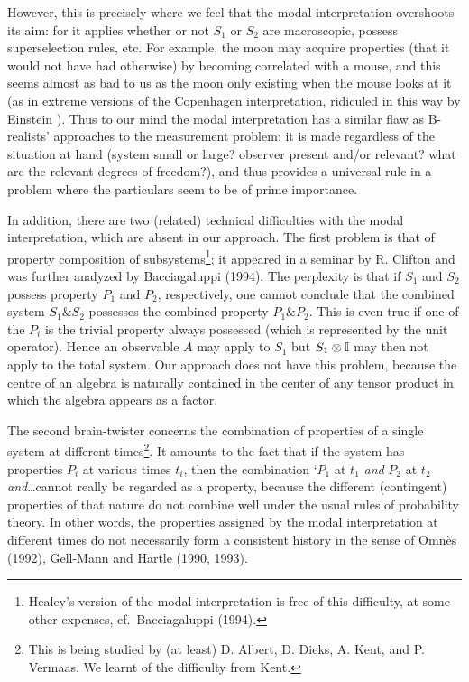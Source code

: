 \documentclass[12pt,titlepage]{article}
\newcommand{\fn}{\footnote}
\begin{document}
However, this is precisely where we feel that the modal interpretation
overshoots its aim: for it
applies whether or not $S_1$  or $S_2$ are
macroscopic, possess superselection rules, etc. For example, the moon may
acquire properties
(that it would not have had otherwise)  by
becoming correlated with a mouse, and this seems almost as bad to us as the
moon only existing when
the mouse looks at it (as in extreme versions of the Copenhagen interpretation,
ridiculed in this way
by Einstein ).
Thus to our mind the modal interpretation   has a similar flaw as B-realists'
approaches to the
measurement problem: it is made regardless of the situation at hand (system
small or large? observer
present and/or relevant? what are the relevant degrees of freedom?), and thus
provides a universal
rule in a problem where the particulars seem to be of prime importance.

In addition, there are two (related) technical difficulties with the modal
interpretation, which are
absent in our approach. The first problem is that of property composition of
subsystems\fn{Healey's
version of the modal interpretation is free of this difficulty, at some other
expenses, cf.\
Bacciagaluppi (1994).}; it appeared in a seminar by R. Clifton and was further
analyzed by
Bacciagaluppi (1994). The  perplexity is that if $S_1$ and $S_2$ possess
property $P_1$ and $P_2$,
respectively, one cannot conclude that the combined system $S_1\& S_2$
possesses the combined
property $P_1\& P_2$. This is even true if one of the $P_i$ is the trivial
property always possessed
(which is represented by the unit operator). Hence an observable $A$ may apply
to $S_1$ but
$S_1\otimes {\Bbb I}$ may then not apply to the total system. Our approach does
not have this
problem, because the centre of an algebra is naturally  contained in the center
of any tensor
product in which the algebra appears as a factor.

The second brain-twister concerns the combination of properties of a single
system at different
times\fn{This is being studied by (at least) D. Albert, D. Dieks, A. Kent, and
P. Vermaas. We learnt
of the difficulty from Kent.}. It amounts to the fact that if the system has
properties $P_i$
at various times $t_i$, then the combination `$P_1$ at $t_1$ {\em and} $P_2$ at
$t_2$ {\em
and}\ldots cannot really be regarded as a property, because the different
(contingent) properties of
that nature do not combine well under the usual rules of probability theory. In
other words,
the properties assigned by the modal interpretation at different times do not
necessarily form a
consistent history in the sense of Omn\`{e}s (1992), Gell-Mann and Hartle
(1990, 1993).
\end{document}
